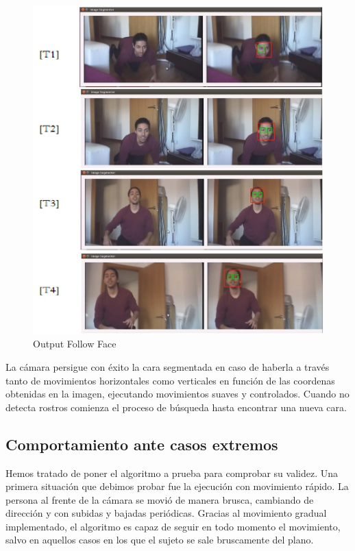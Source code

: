\begin{figure}[H]
  \begin{center}
    \includegraphics[width=0.98\linewidth]{figures/ffoutput.jpg}
		\caption{Output Follow Face}
		\label{fig.ffoutput}
		\end{center}
\end{figure}

La cámara persigue con éxito la cara segmentada en caso de haberla a través tanto de movimientos horizontales como verticales en función de las coordenas obtenidas en la imagen, ejecutando movimientos suaves y controlados. Cuando no detecta rostros comienza el proceso de búsqueda hasta encontrar una nueva cara.

\subsection{Comportamiento ante casos extremos}
Hemos tratado de poner el algoritmo a prueba para comprobar su validez. Una primera situación que debimos probar fue la ejecución con movimiento rápido. La persona al frente de la cámara se movió de manera brusca, cambiando de dirección y con subidas y bajadas periódicas. Gracias al movimiento gradual implementado, el algoritmo es capaz de seguir en todo momento el movimiento, salvo en aquellos casos en los que el sujeto se sale bruscamente del plano. 

